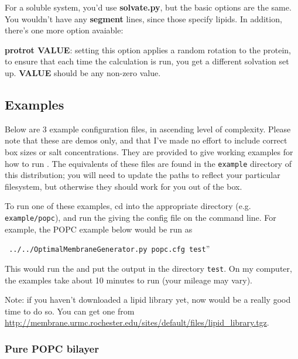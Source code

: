 \documentclass[12pt]{article}
\begin{document}
For a soluble system, you'd use {\bf solvate.py}, but the basic options are the
same.  You wouldn't have any {\bf segment} lines, since those specify lipids.
In addition, there's one more option avaiable:

{\bf protrot VALUE}: setting this option applies a random rotation to the
protein, to ensure that each time the calculation is run, you get a different
solvation set up.  {\bf VALUE} should be any non-zero value.

\subsection{Examples}
\label{ss:examples}

Below are 3 example configuration files, in ascending level of complexity.
Please note that these are demos only, and that I've made no effort to
include correct box sizes or salt concentrations.  They are provided to
give working examples for how to run \omgwtf.  The equivalents of these
files are found in the {\tt example} directory of this distribution; you
will need to update the paths to reflect your particular filesystem, but
otherwise they should work for you out of the box.

To run one of these examples, cd into the appropriate directory (e.g. {\tt
example/popc}), and run the {\omgwtf} giving the config file on the command
line.  For example, the POPC example below would be run as

{\tt
../../OptimalMembraneGenerator.py popc.cfg test}''

This would run the
{\omgwtf} and put the output in the directory {\tt test}.  On my computer,
the examples take about 10 minutes to run (your mileage may vary).

Note: if you haven't downloaded a lipid library yet, now would be a really
good time to do so.  You can get one from
\url{http://membrane.urmc.rochester.edu/sites/default/files/lipid_library.tgz}.


\subsubsection{Pure POPC bilayer}
\end{document}
